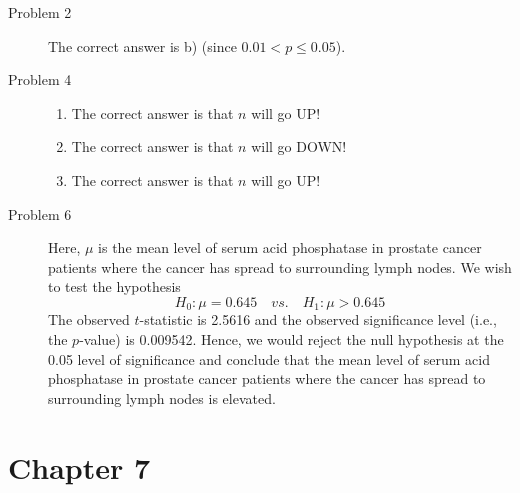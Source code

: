 \documentclass{article}\usepackage[]{graphicx}\usepackage[]{color}
\begin{document}
\begin{description}
  \item[Problem 2] The correct answer is b) (since $0.01 < p \le 0.05$).
  
  \item[Problem 4]
  
  \begin{enumerate}
  
    \item The correct answer is that $n$ will go UP!
    
    \item The correct answer is that $n$ will go DOWN!
    
    \item The correct answer is that $n$ will go UP!
  
  \end{enumerate}

  \item[Problem 6] Here, $\mu$ is the mean level of serum acid phosphatase in prostate cancer patients where the cancer has spread to surrounding lymph nodes. We wish to test the hypothesis
  \begin{equation*}
    H_0: \mu = 0.645 \quad vs. \quad H_1: \mu > 0.645
  \end{equation*}
The observed $t$-statistic is 2.5616 and the observed significance level (i.e., the $p$-value) is 0.009542. Hence, we would reject the null hypothesis at the 0.05 level of significance and conclude that the mean level of serum acid phosphatase in prostate cancer patients where the cancer has spread to surrounding lymph nodes is elevated.

\end{description}


\section{Chapter 7}
\end{document}
